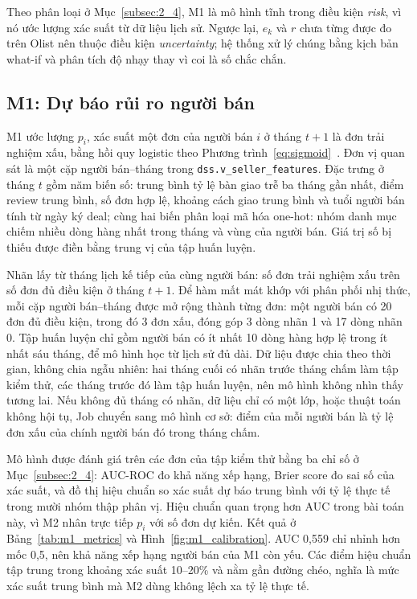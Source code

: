 \documentclass[a4paper]{article}
\begin{document}
Theo phân loại ở Mục~\ref{subsec:2_4}, M1 là mô hình tĩnh trong điều kiện \textit{risk}, vì nó ước lượng xác suất từ dữ liệu lịch sử. Ngược lại, $e_k$ và $r$ chưa từng được đo trên Olist nên thuộc điều kiện \textit{uncertainty}; hệ thống xử lý chúng bằng kịch bản what-if và phân tích độ nhạy thay vì coi là số chắc chắn.

\subsection{M1: Dự báo rủi ro người bán}
\label{subsec:5_5}

M1 ước lượng $p_i$, xác suất một đơn của người bán $i$ ở tháng $t+1$ là đơn trải nghiệm xấu, bằng hồi quy logistic theo Phương trình~\eqref{eq:sigmoid}~\cite{bib:sklearn}. Đơn vị quan sát là một cặp người bán--tháng trong \texttt{dss.\allowbreak{}v\_\allowbreak{}seller\_\allowbreak{}features}. Đặc trưng ở tháng $t$ gồm năm biến số: trung bình tỷ lệ bàn giao trễ ba tháng gần nhất, điểm review trung bình, số đơn hợp lệ, khoảng cách giao trung bình và tuổi người bán tính từ ngày ký deal; cùng hai biến phân loại mã hóa one-hot: nhóm danh mục chiếm nhiều dòng hàng nhất trong tháng và vùng của người bán. Giá trị số bị thiếu được điền bằng trung vị của tập huấn luyện.

Nhãn lấy từ tháng lịch kế tiếp của cùng người bán: số đơn trải nghiệm xấu trên số đơn đủ điều kiện ở tháng $t+1$. Để hàm mất mát khớp với phân phối nhị thức, mỗi cặp người bán--tháng được mở rộng thành từng đơn: một người bán có 20 đơn đủ điều kiện, trong đó 3 đơn xấu, đóng góp 3 dòng nhãn 1 và 17 dòng nhãn 0. Tập huấn luyện chỉ gồm người bán có ít nhất 10 dòng hàng hợp lệ trong ít nhất sáu tháng, để mô hình học từ lịch sử đủ dài. Dữ liệu được chia theo thời gian, không chia ngẫu nhiên: hai tháng cuối có nhãn trước tháng chấm làm tập kiểm thử, các tháng trước đó làm tập huấn luyện, nên mô hình không nhìn thấy tương lai. Nếu không đủ tháng có nhãn, dữ liệu chỉ có một lớp, hoặc thuật toán không hội tụ, Job chuyển sang mô hình cơ sở: điểm của mỗi người bán là tỷ lệ đơn xấu của chính người bán đó trong tháng chấm.

Mô hình được đánh giá trên các đơn của tập kiểm thử bằng ba chỉ số ở Mục~\ref{subsec:2_4}: AUC-ROC đo khả năng xếp hạng, Brier score đo sai số của xác suất, và đồ thị hiệu chuẩn so xác suất dự báo trung bình với tỷ lệ thực tế trong mười nhóm thập phân vị. Hiệu chuẩn quan trọng hơn AUC trong bài toán này, vì M2 nhân trực tiếp $p_i$ với số đơn dự kiến. Kết quả ở Bảng~\ref{tab:m1_metrics} và Hình~\ref{fig:m1_calibration}. AUC 0,559 chỉ nhỉnh hơn mốc 0,5, nên khả năng xếp hạng người bán của M1 còn yếu. Các điểm hiệu chuẩn tập trung trong khoảng xác suất 10--20\% và nằm gần đường chéo, nghĩa là mức xác suất trung bình mà M2 dùng không lệch xa tỷ lệ thực tế.
\end{document}

